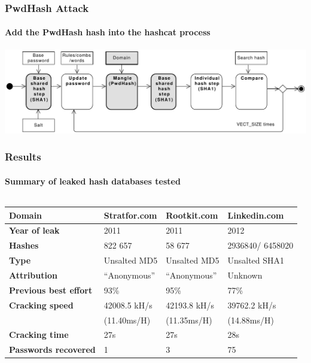 \documentclass[handout, notes=hide]{beamer}
\begin{document}
\begin{frame}
\frametitle{PwdHash Attack}
\framesubtitle{Add the PwdHash hash into the hashcat process}
\setlength{\parskip}{0.5em}

\includegraphics[width=1.0\textwidth]{process-mangle}

\end{frame}


\begin{frame}
\frametitle{Results}
\framesubtitle{Summary of leaked hash databases tested}
\setlength{\parskip}{0.5em}

\begin{columns}[T]
\begin{column}[T]{1.0\textwidth}
\setlength{\parskip}{0.5em}

\fontsize{9pt}{14}\selectfont

\begin{tabular}{l|p{2.0cm}|p{2.0cm}|p{2.2cm}}
	{\bf Domain} & Stratfor.com & Rootkit.com  & Linkedin.com \\ \hline
	{\bf Year of leak}   & 2011         & 2011         & 2012 \\
	{\bf Hashes} & 822 657      & 58 677       & 2936840/ 6458020 \\
	{\bf Type}   & Unsalted MD5 & Unsalted MD5 & Unsalted SHA1 \\
	{\bf Attribution} & ``Anonymous'' & ``Anonymous'' & Unknown \\
	{\bf Previous best effort} & 93\% & 95\% & 77\% \\
	{\bf Cracking speed} & 42008.5 kH/s & 42193.8 kH/s & 39762.2 kH/s \\
	{\bf } & (11.40ms/H) & (11.35ms/H) & (14.88ms/H) \\
	{\bf Cracking time} & 27s & 27s & 28s \\
	{\bf Passwords recovered} & 1 & 3 & 75 \\
\end{tabular}

\end{column}
\end{columns}


\end{frame}
\end{document}

